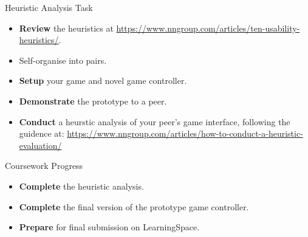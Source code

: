 \documentclass[xcolor={dvipsnames}]{beamer}\usepackage{etoolbox}\newtoggle{printable}\togglefalse{printable}
\begin{document}
\begin{frame}{Heuristic Analysis Task}
	\begin{itemize}
		\item \textbf{Review} the heuristics at \url{https://www.nngroup.com/articles/ten-usability-heuristics/}.
		\item Self-organise into pairs.
		\item \textbf{Setup} your game and novel game controller.
		\item \textbf{Demonstrate} the prototype to a peer.
		\item \textbf{Conduct} a heurstic analysis of your peer's game interface, following the guidence at:
		\url{https://www.nngroup.com/articles/how-to-conduct-a-heuristic-evaluation/}
	\end{itemize}
\end{frame}

\begin{frame}{Coursework Progress}
	\begin{itemize}
		\item \textbf{Complete} the heuristic analysis.
		\item \textbf{Complete} the final version of the prototype game controller. 
		\item \textbf{Prepare} for final submission on LearningSpace. 
	\end{itemize}
\end{frame}


%
\end{document}
